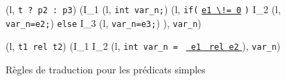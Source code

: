 \begin{figure*}[h!]
{    {
      {
        (l, \mbox{\lstinline't ? p2 : p3'}) 
        (I_1 \concat (l, \mbox{\lstinline'int var_n;'})
        \concat (l,  \mbox{\lstinline'if('}
        \underline{\mbox{\lstinline'e1'}\Zclear \mbox{\lstinline' \!= 0'}}
        \mbox{\lstinline')'} \bopen
        I_2 \concat (l, \mbox{\lstinline'var_n=e2;'}) \bclose
        \mbox{\lstinline'else'} \bopen
        I_3 \concat (l, \mbox{\lstinline'var_n=e3;'}) \bclose),
        \mbox{\lstinline'var_n'})
      }
    }

    {
      {(l, \mbox{\lstinline't1 rel t2'}) 
        (I_1 \concat I_2 \concat (l,
        \mbox{\lstinline'int var_n ='}~
        \underline{\mbox{\lstinline' e1'} \Zclear \mbox{\lstinline' rel e2'}
          \Zclear}
        \semicolon
        ), \mbox{\lstinline'var_n'})}
    }
  }
  \caption{Règles de traduction pour les prédicats simples}
  \label{fig:pred-logic}
\end{figure*}
